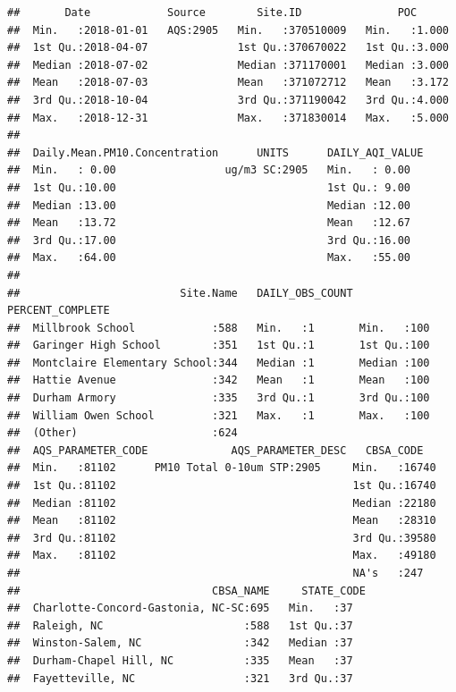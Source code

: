 \documentclass[12pt,]{article}
\begin{document}
\begin{verbatim}
##       Date            Source        Site.ID               POC       
##  Min.   :2018-01-01   AQS:2905   Min.   :370510009   Min.   :1.000  
##  1st Qu.:2018-04-07              1st Qu.:370670022   1st Qu.:3.000  
##  Median :2018-07-02              Median :371170001   Median :3.000  
##  Mean   :2018-07-03              Mean   :371072712   Mean   :3.172  
##  3rd Qu.:2018-10-04              3rd Qu.:371190042   3rd Qu.:4.000  
##  Max.   :2018-12-31              Max.   :371830014   Max.   :5.000  
##                                                                     
##  Daily.Mean.PM10.Concentration      UNITS      DAILY_AQI_VALUE
##  Min.   : 0.00                 ug/m3 SC:2905   Min.   : 0.00  
##  1st Qu.:10.00                                 1st Qu.: 9.00  
##  Median :13.00                                 Median :12.00  
##  Mean   :13.72                                 Mean   :12.67  
##  3rd Qu.:17.00                                 3rd Qu.:16.00  
##  Max.   :64.00                                 Max.   :55.00  
##                                                               
##                         Site.Name   DAILY_OBS_COUNT PERCENT_COMPLETE
##  Millbrook School            :588   Min.   :1       Min.   :100     
##  Garinger High School        :351   1st Qu.:1       1st Qu.:100     
##  Montclaire Elementary School:344   Median :1       Median :100     
##  Hattie Avenue               :342   Mean   :1       Mean   :100     
##  Durham Armory               :335   3rd Qu.:1       3rd Qu.:100     
##  William Owen School         :321   Max.   :1       Max.   :100     
##  (Other)                     :624                                   
##  AQS_PARAMETER_CODE             AQS_PARAMETER_DESC   CBSA_CODE    
##  Min.   :81102      PM10 Total 0-10um STP:2905     Min.   :16740  
##  1st Qu.:81102                                     1st Qu.:16740  
##  Median :81102                                     Median :22180  
##  Mean   :81102                                     Mean   :28310  
##  3rd Qu.:81102                                     3rd Qu.:39580  
##  Max.   :81102                                     Max.   :49180  
##                                                    NA's   :247    
##                              CBSA_NAME     STATE_CODE
##  Charlotte-Concord-Gastonia, NC-SC:695   Min.   :37  
##  Raleigh, NC                      :588   1st Qu.:37  
##  Winston-Salem, NC                :342   Median :37  
##  Durham-Chapel Hill, NC           :335   Mean   :37  
##  Fayetteville, NC                 :321   3rd Qu.:37  

\end{verbatim}
\end{document}
